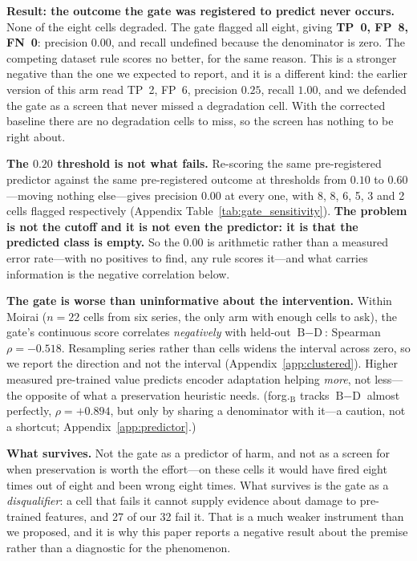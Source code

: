 \textbf{Result: the outcome the gate was registered to predict never occurs.}
None of the eight cells degraded.  The gate flagged all eight, giving
\textbf{TP~0, FP~8, FN~0}: precision $0.00$, and recall undefined because the
denominator is zero.  The competing dataset rule scores no better, for the
same reason.  This is a stronger negative than the one we expected to report,
and it is a different kind: the earlier version of this arm read TP~2, FP~6,
precision $0.25$, recall $1.00$, and we defended the gate as a screen that
never missed a degradation cell.  With the corrected baseline there are no
degradation cells to miss, so the screen has nothing to be right about.

\textbf{The $0.20$ threshold is not what fails.} Re-scoring the same
pre-registered predictor against the same pre-registered outcome at thresholds
from $0.10$ to $0.60$---moving nothing else---gives precision $0.00$ at every
one, with 8, 8, 6, 5, 3 and 2 cells flagged respectively (Appendix
Table~\ref{tab:gate_sensitivity}).  \textbf{The problem is not the cutoff and
it is not even the predictor: it is that the predicted class is empty.}  So the
$0.00$ is arithmetic rather than a measured error rate---with no positives to
find, any rule scores it---and what carries information is the negative
correlation below.

\textbf{The gate is worse than uninformative about the intervention.}
Within Moirai ($n{=}22$ cells from six series, the only arm with enough cells to
ask), the gate's continuous score correlates \emph{negatively} with held-out
$\text{B}{-}\text{D}$: Spearman $\rho{=}{-}0.518$.  Resampling series rather
than cells widens the interval across zero, so we report the direction and not
the interval (Appendix~\ref{app:clustered}).  Higher measured pre-trained value
predicts encoder adaptation helping \emph{more}, not less---the opposite of
what a preservation heuristic needs.  (forg.$_\text{B}$ tracks
$\text{B}{-}\text{D}$ almost perfectly, $\rho{=}{+}0.894$, but only by sharing a
denominator with it---a caution, not a shortcut;
Appendix~\ref{app:predictor}.)

\textbf{What survives.} Not the gate as a predictor of harm, and not as a
screen for when preservation is worth the effort---on these cells it would have
fired eight times out of eight and been wrong eight times.  What survives is
the gate as a \emph{disqualifier}: a cell that fails it cannot supply evidence
about damage to pre-trained features, and 27 of our 32 fail it.  That is a much
weaker instrument than we proposed, and it is why this paper reports a negative
result about the premise rather than a diagnostic for the phenomenon.
